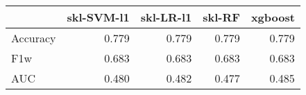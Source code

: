 \begin{tabular}{lrrrr}
\toprule
{} &  skl-SVM-l1 &  skl-LR-l1 &  skl-RF &  xgboost \\
\midrule
Accuracy &       0.779 &      0.779 &   0.779 &    0.779 \\
F1w      &       0.683 &      0.683 &   0.683 &    0.683 \\
AUC      &       0.480 &      0.482 &   0.477 &    0.485 \\
\bottomrule
\end{tabular}
